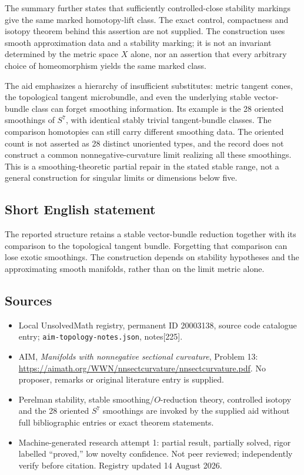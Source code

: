 \documentclass[11pt]{article}
\begin{document}
The summary further states that sufficiently controlled-close stability markings give the same marked homotopy-lift class. The exact control, compactness and isotopy theorem behind this assertion are not supplied. The construction uses smooth approximation data and a stability marking; it is not an invariant determined by the metric space $X$ alone, nor an assertion that every arbitrary choice of homeomorphism yields the same marked class.

The aid emphasizes a hierarchy of insufficient substitutes: metric tangent cones, the topological tangent microbundle, and even the underlying stable vector-bundle class can forget smoothing information. Its example is the 28 oriented smoothings of $S^7$, with identical stably trivial tangent-bundle classes. The comparison homotopies can still carry different smoothing data. The oriented count is not asserted as 28 distinct unoriented types, and the record does not construct a common nonnegative-curvature limit realizing all these smoothings. This is a smoothing-theoretic partial repair in the stated stable range, not a general construction for singular limits or dimensions below five.
\subsection{Short English statement}
The reported structure retains a stable vector-bundle reduction together with its comparison to the topological tangent bundle. Forgetting that comparison can lose exotic smoothings. The construction depends on stability hypotheses and the approximating smooth manifolds, rather than on the limit metric alone.
\subsection{Sources}
\begin{itemize}
\item Local UnsolvedMath registry, permanent ID 20003138, source code catalogue entry; \texttt{aim-topology-notes.json}, notes[225].
\item AIM, \emph{Manifolds with nonnegative sectional curvature}, Problem 13: \url{https://aimath.org/WWN/nnsectcurvature/nnsectcurvature.pdf}. No proposer, remarks or original literature entry is supplied.
\item Perelman stability, stable smoothing/$O$-reduction theory, controlled isotopy and the 28 oriented $S^7$ smoothings are invoked by the supplied aid without full bibliographic entries or exact theorem statements.
\item Machine-generated research attempt 1: partial result, partially solved, rigor labelled ``proved,'' low novelty confidence. Not peer reviewed; independently verify before citation. Registry updated 14 August 2026.
\end{itemize}
\end{document}
